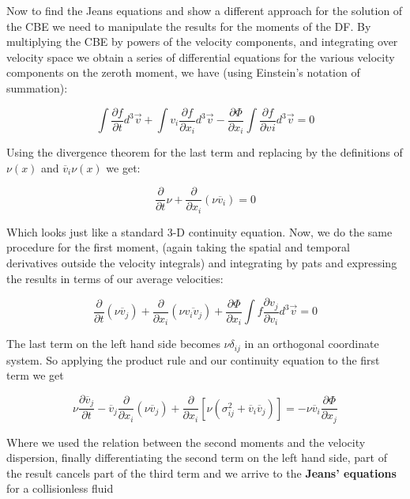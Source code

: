 Now to find the Jeans equations and show a different approach for the solution of the CBE we need to manipulate the results for the moments of the DF. By multiplying the CBE by powers of the velocity components, and integrating over velocity space we obtain a series of differential equations for the various velocity components on the zeroth moment, we have (using Einstein's notation of summation):

\begin{equation}
\int \frac{\partial f}{\partial t}d^{3}\vec{v}+ \int v_{i}\frac{\partial f}{\partial x_{i}} d^{3}\vec{v}- \frac{\partial\Phi}{\partial x_{i}}\int \frac{\partial f}{\partial v_{}i} d^{3}\vec{v}= 0
\end{equation}

Using the divergence theorem for the last term and replacing by the definitions of $\nu(x)$ and $\overline{v}_{i}\nu(x)$ we get:

\begin{equation}
\frac{\partial}{\partial t}\nu+\frac{\partial}{\partial x_{i}}(\nu \overline{v}_{i})=0
\end{equation}

Which looks just like a standard 3-D continuity equation. Now, we do the same procedure for the first moment, (again taking the spatial and temporal derivatives outside the velocity integrals) and integrating by pats and expressing the results in terms of our average velocities:

\begin{equation}
\frac{\partial}{\partial t}(\nu \overline{v}_{j})+\frac{\partial}{\partial x_{i}}(\nu \overline{v_{i}v_{j}})+\frac{\partial \Phi}{\partial x_{i}}\int f\frac{\partial v_{j}}{\partial v_{i}}d^{3}\vec{v}=0
\end{equation} 

The last term on the left hand side becomes $\nu \delta_{ij}$ in an orthogonal coordinate system. So applying the product rule and our continuity equation to the first term we get

\begin{equation}
\nu \frac{\partial \overline{v}_{j}}{\partial t}-\overline{v}_{j}\frac{\partial}{\partial x_{i}}(\nu \overline{v}_{j})+\frac{\partial}{\partial x_{i}}[\nu(\sigma_{ij}^{2}+\overline{v}_{i}\overline{v}_{j})]=-\nu \overline{v}_{i}\frac{\partial \Phi}{\partial x_{j}}
\end{equation}

Where we used the relation between the second moments and the velocity dispersion, finally differentiating the second term on the left hand side, part of the result cancels part of the third term and we arrive to the \textbf{Jeans' equations} for a collisionless fluid

